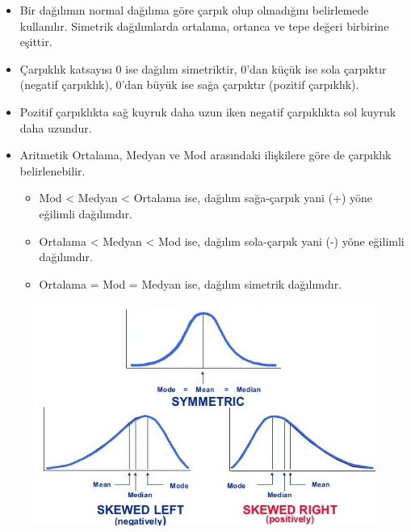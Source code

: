 \documentclass[
  letterpaper,
  DIV=11,
  numbers=noendperiod]{scrreprt}
\begin{document}
\begin{itemize}
\item
  Bir dağılımın normal dağılıma göre çarpık olup olmadığını belirlemede
  kullanılır. Simetrik dağılımlarda ortalama, ortanca ve tepe değeri
  birbirine eşittir.
\item
  Çarpıklık katsayısı 0 ise dağılım simetriktir, 0'dan küçük ise sola
  çarpıktır (negatif çarpıklık), 0'dan büyük ise sağa çarpıktır (pozitif
  çarpıklık).
\item
  Pozitif çarpıklıkta sağ kuyruk daha uzun iken negatif çarpıklıkta sol
  kuyruk daha uzundur.
\item
  Aritmetik Ortalama, Medyan ve Mod arasındaki ilişkilere göre de
  çarpıklık belirlenebilir.

  \begin{itemize}
  \item
    Mod \textless{} Medyan \textless{} Ortalama ise, dağılım sağa-çarpık
    yani (+) yöne eğilimli dağılımdır.
  \item
    Ortalama \textless{} Medyan \textless{} Mod ise, dağılım sola-çarpık
    yani (-) yöne eğilimli dağılımdır.
  \item
    Ortalama = Mod = Medyan ise, dağılım simetrik dağılımdır.
  \end{itemize}
\end{itemize}

\begin{figure}

{\centering \includegraphics{images/mean_median_mode.png}

}

\end{figure}
\end{document}
